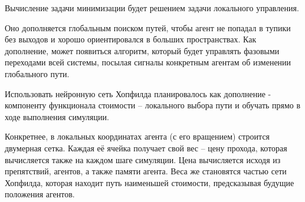 Вычисление задачи минимизации будет решением задачи локального
управления. \cite{ota2022proposal}

Оно дополняется глобальным поиском путей, чтобы агент не
попадал в тупики без выходов и хорошо ориентировался в больших
пространствах. Как дополнение, может появиться алгоритм, который будет
управлять фазовыми переходами всей системы, посылая сигналы конкретным
агентам об изменении глобального пути.

Использовать нейронную сеть Хопфилда планировалось как дополнение -
компоненту функционала стоимости -- локального выбора пути и обучать
прямо в ходе выполнения симуляции.

Конкретнее, в локальных координатах агента (с его вращением) строится
двумерная сетка. Каждая её ячейка получает свой вес -- цену прохода,
которая вычисляется также на каждом шаге симуляции. Цена вычисляется
исходя из препятствий, агентов, а также памяти агента. Веса же
становятся частью сети Хопфилда, которая находит путь наименьшей
стоимости, предсказывая будущие положения агентов.
